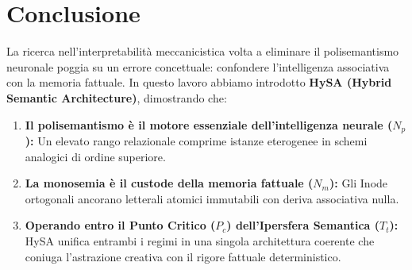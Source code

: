 \documentclass[11pt,a4paper]{article}
\theoremstyle{definition}
\begin{document}
\section{Conclusione}

La ricerca nell'interpretabilità meccanicistica volta a eliminare il polisemantismo neuronale poggia su un errore concettuale: confondere l'intelligenza associativa con la memoria fattuale. In questo lavoro abbiamo introdotto \textbf{HySA (Hybrid Semantic Architecture)}, dimostrando che:
\begin{enumerate}[leftmargin=*, itemsep=2.0pt]
    \item \textbf{Il polisemantismo è il motore essenziale dell'intelligenza neurale ($N_p$):} Un elevato rango relazionale comprime istanze eterogenee in schemi analogici di ordine superiore.
    \item \textbf{La monosemia è il custode della memoria fattuale ($N_m$):} Gli Inode ortogonali ancorano letterali atomici immutabili con deriva associativa nulla.
    \item \textbf{Operando entro il Punto Critico ($P_c$) dell'Ipersfera Semantica ($T_t$):} HySA unifica entrambi i regimi in una singola architettura coerente che coniuga l'astrazione creativa con il rigore fattuale deterministico.
\end{enumerate}
\end{document}
